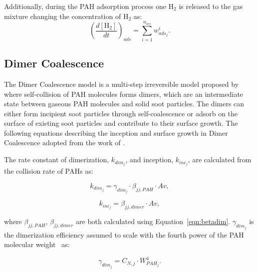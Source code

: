 Additionally, during the PAH adsorption process one $\mathrm{H_2}$ is released to the gas mixture changing the concentration of $\mathrm{H_2}$ as:
\begin{equation}
	\left(
	\frac{d\left[{\mathrm{H_2}}\right]}{dt}
	\right)_{ads}
	= 
	\sum_{i=1}^{n_{sec}}w^i_{ads_j}
	\label{eqn:H2scrub_reacdim}.
\end{equation}

\subsection{Dimer Coalescence}
\label{sec:dimcoal}
The Dimer Coalescence model is a multi-step irreversible model proposed by \citet{blanquart2009joint} where self-collision of PAH molecules forms dimers, which are an intermediate state between gaseous PAH molecules and solid soot particles. The dimers can either form incipient soot particles through self-coalescence or adsorb on the surface of existing soot particles and contribute to their surface growth. The following equations describing the inception and surface growth in Dimer Coalescence adopted from the work of \citet{sun2021modelling}.


The rate constant of dimerization, ${k_{dim_{j}}}$, and inception, ${k_{inc_{j}}}$, are calculated from the collision rate of PAHs as:

\begin{equation}
	k_{dim_{j}}=
	\gamma_{dim_j}\cdot\beta_{jj,PAH}\cdot Av
	\label{eqn:kdim_dimcoal},
\end{equation}

\begin{equation}
	k_{inc_{j}}=
	\beta_{jj,dimer}\cdot Av
	\label{eqn:kinc_dimcoal},
\end{equation}

\noindent where $\beta_{jj,PAH}$, $\beta_{jj,dimer}$ are both calculated using Equation~\eqref{eqn:betadim}. $\gamma_{dim_j}$ is the dimerization efficiency assumed to scale with the fourth power of the PAH molecular weight~\cite{blanquart2009analyzing} as:

\begin{equation}
	\gamma_{dim_j}=
	C_{N,j}\cdot W_{PAH_j}^4.
	\label{eqn:gamma_dimcoal}
\end{equation} 

